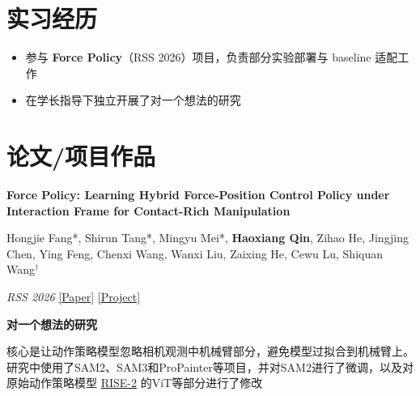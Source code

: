 \documentclass{resume}
\begin{document}

\section{实习经历}
\begin{itemize}
  \item 参与 \textbf{Force Policy}（RSS 2026）项目，负责部分实验部署与 baseline 适配工作
  \item 在学长指导下独立开展了对一个想法的研究
\end{itemize}




\section{论文/项目作品}
\textbf{Force Policy: Learning Hybrid Force-Position Control Policy under Interaction Frame for Contact-Rich Manipulation}

Hongjie Fang*, Shirun Tang*, Mingyu Mei*, \textbf{Haoxiang Qin}, Zihao He, Jingjing Chen, Ying Feng, Chenxi Wang, Wanxi Liu, Zaixing He, Cewu Lu, Shiquan Wang$^\dagger$

\textit{RSS 2026} \href{https://arxiv.org/abs/2602.22088}{[Paper]} \href{https://force-policy.github.io/}{[Project]}

\vspace{1.0ex}

\textbf{对一个想法的研究}

核心是让动作策略模型忽略相机观测中机械臂部分，避免模型过拟合到机械臂上。研究中使用了SAM2、SAM3和ProPainter等项目，并对SAM2进行了微调，以及对原始动作策略模型 \href{https://github.com/1JI0O/RISE-2/}{RISE-2} 的ViT等部分进行了修改
\end{document}
